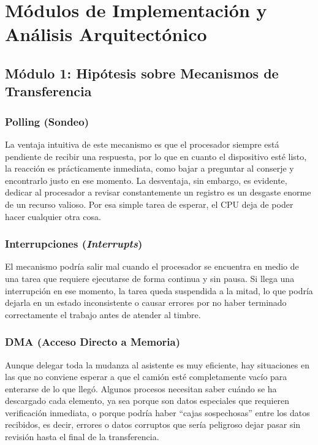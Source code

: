 \documentclass[12pt,letterpaper]{article}
\begin{document}
\newpage

\section*{Módulos de Implementación y Análisis Arquitectónico}

\subsection*{Módulo 1: Hipótesis sobre Mecanismos de Transferencia}

\subsubsection*{Polling (Sondeo)}
La ventaja intuitiva de este mecanismo es que el procesador siempre está pendiente de recibir una respuesta, por
lo que en cuanto el dispositivo esté listo, la reacción es prácticamente inmediata, como bajar a preguntar al
conserje y encontrarlo justo en ese momento. La desventaja, sin embargo, es evidente, dedicar al procesador a
revisar constantemente un registro es un desgaste enorme de un recurso valioso. Por esa simple tarea de esperar,
el CPU deja de poder hacer cualquier otra cosa.

\subsubsection*{Interrupciones (\textit{Interrupts})}
El mecanismo podría salir mal cuando el procesador se encuentra en medio de una tarea que requiere ejecutarse de
forma continua y sin pausa. Si llega una interrupción en ese momento, la tarea queda suspendida a la mitad, lo
que podría dejarla en un estado inconsistente o causar errores por no haber terminado correctamente el trabajo
antes de atender al timbre.

\subsubsection*{DMA (Acceso Directo a Memoria)}
Aunque delegar toda la mudanza al asistente es muy eficiente, hay situaciones en las que no conviene esperar a
que el camión esté completamente vacío para enterarse de lo que llegó. Algunos procesos necesitan saber cuándo
se ha descargado cada elemento, ya sea porque son datos especiales que requieren verificación inmediata, o porque
podría haber ``cajas sospechosas'' entre los datos recibidos, es decir, errores o datos corruptos que sería
peligroso dejar pasar sin revisión hasta el final de la transferencia.
\end{document}
